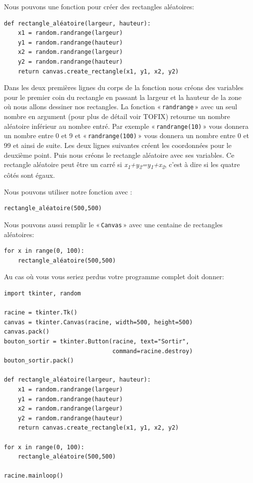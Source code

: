 Nous pouvons une fonction pour créer des rectangles aléatoires:
\begin{Verbatim}[frame=single,rulecolor=\color{mbleu}, label=à taper]
def rectangle_aléatoire(largeur, hauteur):
    x1 = random.randrange(largeur)
    y1 = random.randrange(hauteur)
    x2 = random.randrange(largeur)
    y2 = random.randrange(hauteur)
    return canvas.create_rectangle(x1, y1, x2, y2)
\end{Verbatim}

Dans les deux premières lignes du corps de la fonction nous créons des variables pour le premier coin du rectangle en passant la largeur et la hauteur de la zone où nous allons dessiner nos rectangles. 
La fonction « \texttt{randrange} » avec un seul nombre en argument (pour plus de détail voir TOFIX) retourne un nombre aléatoire inférieur au nombre entré. Par exemple « \texttt{randrange(10)} » vous donnera un nombre entre 0 et 9 et « \texttt{randrange(100)} » vous donnera un nombre entre 0 et 99 et ainsi de suite. Les deux lignes suivantes créent les coordonnées pour le deuxième point. Puis nous créons le rectangle aléatoire avec ses variables. Ce rectangle aléatoire peut être un carré si \emph{x\textsubscript{1}+y\textsubscript{2}=y\textsubscript{1}+x\textsubscript{2}}, c'est à dire si les quatre côtés sont égaux.

Nous pouvons utiliser notre fonction avec :
\begin{Verbatim}[frame=single,rulecolor=\color{mbleu}, label=à taper]
rectangle_aléatoire(500,500)
\end{Verbatim}

Nous pouvons aussi remplir le « \texttt{Canvas} » avec une centaine de rectangles aléatoires:
\begin{Verbatim}[frame=single,rulecolor=\color{mbleu}, label=à taper]
for x in range(0, 100):
    rectangle_aléatoire(500,500)
\end{Verbatim}

Au cas où vous vous seriez perdus votre programme complet doit donner:

\begin{Verbatim}[frame=single,rulecolor=\color{mbleu}, label=à taper]
import tkinter, random

racine = tkinter.Tk()
canvas = tkinter.Canvas(racine, width=500, height=500)
canvas.pack()
bouton_sortir = tkinter.Button(racine, text="Sortir",
                               command=racine.destroy)
bouton_sortir.pack()

def rectangle_aléatoire(largeur, hauteur):
    x1 = random.randrange(largeur)
    y1 = random.randrange(hauteur)
    x2 = random.randrange(largeur)
    y2 = random.randrange(hauteur)
    return canvas.create_rectangle(x1, y1, x2, y2)

for x in range(0, 100):
    rectangle_aléatoire(500,500)

racine.mainloop()
\end{Verbatim}

